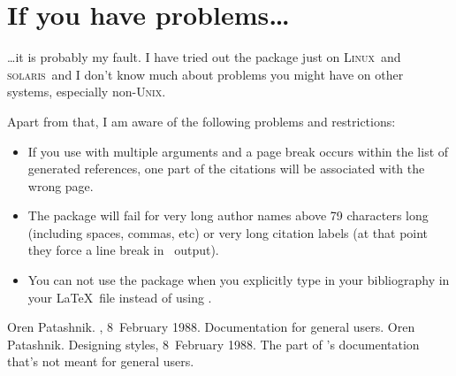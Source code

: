 \documentclass{article}
\newcommand{\Unix}{\textsc{Unix}}
\newcommand{\Linux}{\textsc{Linux}}
\newcommand{\solaris}{\textsc{solaris}}
\newcommand{\ltxinp}[1]{\texttt{\string#1}}
\begin{document}
\section{If you have problems\ldots}

\ldots it is probably my fault. I have tried out the package just on \Linux\
and \solaris\ and I don't know much about problems you might have on other
systems, especially non-\Unix.

Apart from that, I am aware of the following problems and restrictions:
\begin{itemize}
\item If you use \ltxinp{\aicite} with multiple arguments and a page break
  occurs within the list of generated references, one part of the citations
  will be associated with the wrong page.
\item The package will fail for very long author names above 79 characters long
  (including spaces, commas, etc) or very long citation labels (at that point
  they force a line break in \BibTeX\ output).
\item You can not use the package when you explicitly type in your bibliography
  in your \LaTeX\ file instead of using \BibTeX.
\end{itemize}

\begin{thebibliography}{1}
 Oren Patashnik.  , 8~February
  1988.  \newblock Documentation for general {\BibTeX} users.
 Oren Patashnik.  \newblock Designing {\BibTeX} styles,
  8~February 1988.  \newblock The part of \BibTeX's documentation that's not
  meant for general users.
\end{thebibliography}
\end{document}
